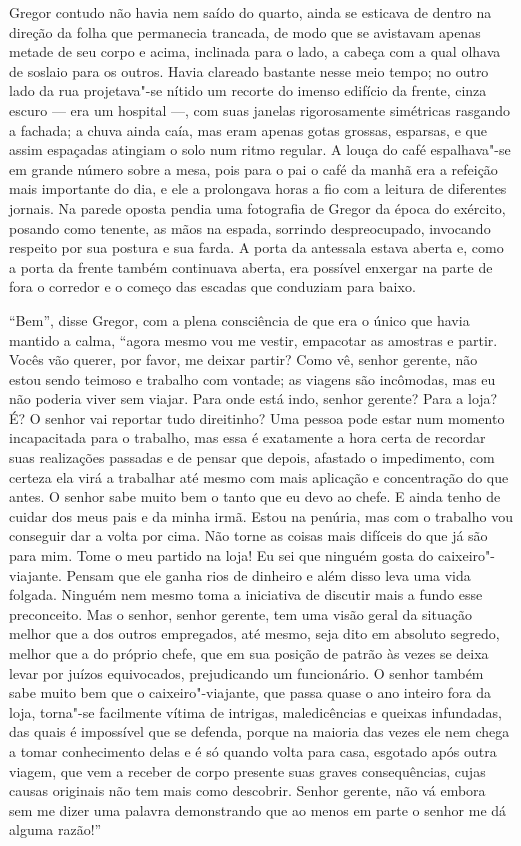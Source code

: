 Gregor contudo não havia nem saído do quarto, ainda se esticava de dentro
na direção da folha que permanecia trancada, de modo que se avistavam
apenas metade de seu corpo e acima, inclinada para o lado, a cabeça com a
qual olhava de soslaio para os outros. Havia clareado bastante nesse meio
tempo; no outro lado da rua projetava"-se nítido um recorte do imenso
edifício da frente, cinza escuro --- era um hospital ---, com suas janelas
rigorosamente simétricas rasgando a fachada; a chuva ainda caía, mas eram
apenas gotas grossas, esparsas, e que assim espaçadas atingiam o solo num
ritmo regular. A louça do café espalhava"-se em grande número sobre a mesa,
pois para o pai o café da manhã era a refeição mais importante do dia, e
ele a prolongava horas a fio com a leitura de diferentes jornais. Na
parede oposta pendia uma fotografia de Gregor da época do exército,
posando como tenente, as mãos na espada, sorrindo despreocupado, invocando
respeito por sua postura e sua farda. A porta da antessala estava aberta
e, como a porta da frente também continuava aberta, era possível enxergar
na parte de fora o corredor e o começo das escadas que conduziam para
baixo.

“Bem”, disse Gregor, com a plena consciência de que era o único que havia
mantido a calma, “agora mesmo vou me vestir, empacotar as amostras e
partir. Vocês vão querer, por favor, me deixar partir? Como vê, senhor
gerente, não estou sendo teimoso e trabalho com vontade; as viagens são
incômodas, mas eu não poderia viver sem viajar. Para onde está indo,
senhor gerente? Para a loja? É? O senhor vai reportar tudo direitinho? Uma
pessoa pode estar num momento incapacitada para o trabalho, mas essa é
exatamente a hora certa de recordar suas realizações passadas e de pensar
que depois, afastado o impedimento, com certeza ela virá a trabalhar até
mesmo com mais aplicação e concentração do que antes. O senhor sabe muito
bem o tanto que eu devo ao chefe. E ainda tenho de cuidar dos meus pais e
da minha irmã. Estou na penúria, mas com o trabalho vou conseguir dar a
volta por cima. Não torne as coisas mais difíceis do que já são para mim.
Tome o meu partido na loja! Eu sei que ninguém gosta do caixeiro"-viajante.
Pensam que ele ganha rios de dinheiro e além disso leva uma vida folgada.
Ninguém nem mesmo toma a iniciativa de discutir mais a fundo esse
preconceito. Mas o senhor, senhor gerente, tem uma visão geral da situação
melhor que a dos outros empregados, até mesmo, seja dito em absoluto
segredo, melhor que a do próprio chefe, que em sua posição de patrão às
vezes se deixa levar por juízos equivocados, prejudicando um funcionário.
O senhor também sabe muito bem que o caixeiro"-viajante, que passa quase o
ano inteiro fora da loja, torna"-se facilmente vítima de intrigas,
maledicências e queixas infundadas, das quais é impossível que se defenda,
porque na maioria das vezes ele nem chega a tomar conhecimento delas e é só
quando volta para casa, esgotado após outra viagem, que vem a receber de
corpo presente suas graves consequências, cujas causas originais não tem
mais como descobrir. Senhor gerente, não vá embora sem me dizer uma
palavra demonstrando que ao menos em parte o senhor me dá alguma razão!”

